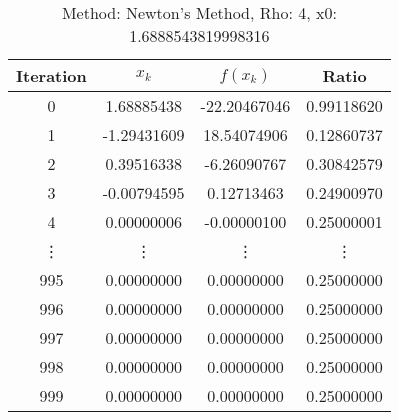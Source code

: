\begin{table}
\centering
\caption{Method: Newton's Method, Rho: 4, x0: 1.6888543819998316}
\label{tab:table_Newton's_Method_4_1_6888543819998316}
\begin{tabular}{c c c c}
\toprule
Iteration &       $x_k$ &     $f(x_k)$ &      Ratio \\
\midrule
        0 &  1.68885438 & -22.20467046 & 0.99118620 \\
        1 & -1.29431609 &  18.54074906 & 0.12860737 \\
        2 &  0.39516338 &  -6.26090767 & 0.30842579 \\
        3 & -0.00794595 &   0.12713463 & 0.24900970 \\
        4 &  0.00000006 &  -0.00000100 & 0.25000001 \\
   \vdots &      \vdots &       \vdots &     \vdots \\
      995 &  0.00000000 &   0.00000000 & 0.25000000 \\
      996 &  0.00000000 &   0.00000000 & 0.25000000 \\
      997 &  0.00000000 &   0.00000000 & 0.25000000 \\
      998 &  0.00000000 &   0.00000000 & 0.25000000 \\
      999 &  0.00000000 &   0.00000000 & 0.25000000 \\
\bottomrule
\end{tabular}
\end{table}
